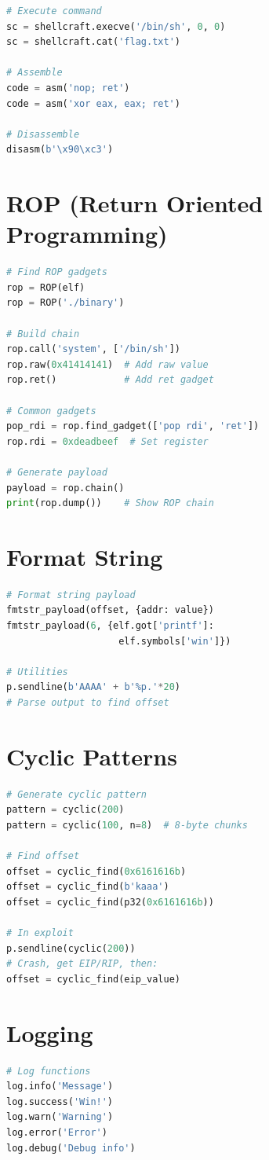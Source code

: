 \documentclass[10pt,landscape,a4paper]{article}
\begin{document}
\begin{multicols}{3}
\begin{lstlisting}[language=Python]
# Execute command
sc = shellcraft.execve('/bin/sh', 0, 0)
sc = shellcraft.cat('flag.txt')

# Assemble
code = asm('nop; ret')
code = asm('xor eax, eax; ret')

# Disassemble
disasm(b'\x90\xc3')
\end{lstlisting}

\section*{ROP (Return Oriented Programming)}
\begin{lstlisting}[language=Python]
# Find ROP gadgets
rop = ROP(elf)
rop = ROP('./binary')

# Build chain
rop.call('system', ['/bin/sh'])
rop.raw(0x41414141)  # Add raw value
rop.ret()            # Add ret gadget

# Common gadgets
pop_rdi = rop.find_gadget(['pop rdi', 'ret'])
rop.rdi = 0xdeadbeef  # Set register

# Generate payload
payload = rop.chain()
print(rop.dump())    # Show ROP chain
\end{lstlisting}

\section*{Format String}
\begin{lstlisting}[language=Python]
# Format string payload
fmtstr_payload(offset, {addr: value})
fmtstr_payload(6, {elf.got['printf']: 
                    elf.symbols['win']})

# Utilities
p.sendline(b'AAAA' + b'%p.'*20)
# Parse output to find offset
\end{lstlisting}

\section*{Cyclic Patterns}
\begin{lstlisting}[language=Python]
# Generate cyclic pattern
pattern = cyclic(200)
pattern = cyclic(100, n=8)  # 8-byte chunks

# Find offset
offset = cyclic_find(0x6161616b)
offset = cyclic_find(b'kaaa')
offset = cyclic_find(p32(0x6161616b))

# In exploit
p.sendline(cyclic(200))
# Crash, get EIP/RIP, then:
offset = cyclic_find(eip_value)
\end{lstlisting}

\section*{Logging}
\begin{lstlisting}[language=Python]
# Log functions
log.info('Message')
log.success('Win!')
log.warn('Warning')
log.error('Error')
log.debug('Debug info')


\end{lstlisting}
\end{multicols}
\end{document}
